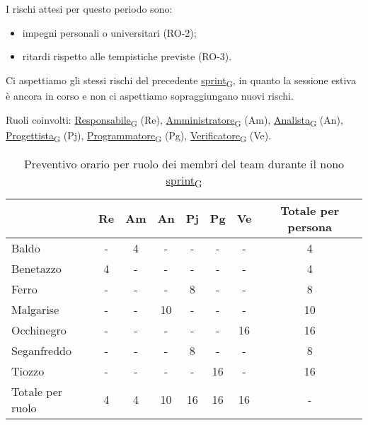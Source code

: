I rischi attesi per questo periodo sono:
\begin{itemize}
	\item impegni personali o universitari (RO-2);
	\item ritardi rispetto alle tempistiche previste (RO-3).
\end{itemize}
Ci aspettiamo gli stessi rischi del precedente \href{https://7last.github.io/docs/pb/documentazione-interna/glossario\#sprint}{sprint\textsubscript{G}}, in quanto la sessione estiva è ancora in corso e non ci aspettiamo sopraggiungano nuovi rischi.

\newpage
{}
Ruoli coinvolti: \href{https://7last.github.io/docs/pb/documentazione-interna/glossario\#responsabile}{Responsabile\textsubscript{G}} (Re), \href{https://7last.github.io/docs/pb/documentazione-interna/glossario\#amministratore}{Amministratore\textsubscript{G}} (Am), \href{https://7last.github.io/docs/pb/documentazione-interna/glossario\#analista}{Analista\textsubscript{G}} (An), \href{https://7last.github.io/docs/pb/documentazione-interna/glossario\#progettista}{Progettista\textsubscript{G}} (Pj), \href{https://7last.github.io/docs/pb/documentazione-interna/glossario\#programmatore}{Programmatore\textsubscript{G}} (Pg), \href{https://7last.github.io/docs/pb/documentazione-interna/glossario\#verificatore}{Verificatore\textsubscript{G}} (Ve).
\begin{table}[!h]
	\centering
	\begin{tabular}{ | l | c | c | c | c | c | c | c | }
		\hline
		\textbf{} & \textbf{Re} & \textbf{Am} &\textbf{An} & \textbf{Pj} & \textbf{Pg} & \textbf{Ve} & \textbf{Totale per persona} \\
		\hline			    %
		Baldo            &  -   &  4   &  -   &  -   &  -   &  -   &  4   \\
		Benetazzo        &  4   &  -   &  -   &  -   &  -   &  -   &  4   \\
		Ferro            &  -   &  -   &  -   &  8   &  -   &  -   &  8   \\
		Malgarise        &  -   &  -   & 10   &  -   &  -   &  -   & 10   \\
		Occhinegro       &  -   &  -   &  -   &  -   &  -   & 16   & 16   \\
		Seganfreddo      &  -   &  -   &  -   &  8   &  -   &  -   &  8   \\
		Tiozzo           &  -   &  -   &  -   &  -   & 16   &  -   & 16   \\
		\hline
		Totale per ruolo &  4   &  4   & 10   & 16   & 16   & 16   &  -   \\
		\hline
	\end{tabular}
	\caption{Preventivo orario per ruolo dei membri del team durante il nono \href{https://7last.github.io/docs/pb/documentazione-interna/glossario\#sprint}{sprint\textsubscript{G}}}

\end{table}

